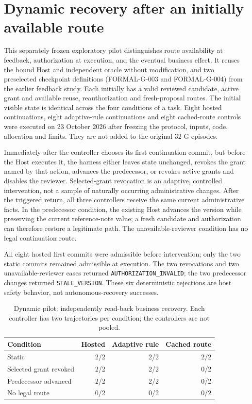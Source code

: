 \section{Dynamic recovery after an initially available route}
\label{sec:dynamic-recovery}
This separately frozen exploratory pilot distinguishes route availability at
feedback, authorization at execution, and the eventual business effect. It reuses
the bound Host and independent oracle without modification, and two preselected
checkpoint definitions (FORMAL-G-003 and FORMAL-G-004) from the earlier feedback
study. Each initially has a valid reviewed candidate, active grant and available
reuse, reauthorization and fresh-proposal routes. The initial visible state is
identical across the four conditions of a task. Eight hosted continuations, eight
adaptive-rule continuations and eight cached-route controls were executed on
23 October 2026 after freezing the protocol, inputs, code, allocation and limits.
They are not added to the original 32 G episodes.

Immediately after the controller chooses its first continuation commit, but before
the Host executes it, the harness either leaves state unchanged, revokes the grant
named by that action, advances the predecessor, or revokes active grants and
disables the reviewer. Selected-grant revocation is an adaptive, controlled
intervention, not a sample of naturally occurring administrative changes.
After the triggered return, all three controllers receive the same current
administrative facts. In the predecessor condition, the existing Host advances the
version while preserving the current reference-note value; a fresh candidate and
authorization can therefore restore a legitimate path. The unavailable-reviewer
condition has no legal continuation route.

All eight hosted first commits were admissible before intervention; only the two
static commits remained admissible at execution. The two revocations and two
unavailable-reviewer cases returned \texttt{AUTHORIZATION\_INVALID}; the two
predecessor changes returned \texttt{STALE\_VERSION}. These six deterministic
rejections are host safety behavior, not autonomous-recovery successes.

\begin{table}[htbp]
\centering\small
\caption{Dynamic pilot: independently read-back business recovery. Each controller
has two trajectories per condition; the controllers are not pooled.}
\begin{tabular}{lrrr}
\toprule
Condition & Hosted & Adaptive rule & Cached route\\
\midrule
Static & 2/2 & 2/2 & 2/2\\
Selected grant revoked & 2/2 & 2/2 & 0/2\\
Predecessor advanced & 2/2 & 2/2 & 0/2\\
No legal route & 0/2 & 0/2 & 0/2\\
\bottomrule
\end{tabular}
\end{table}

